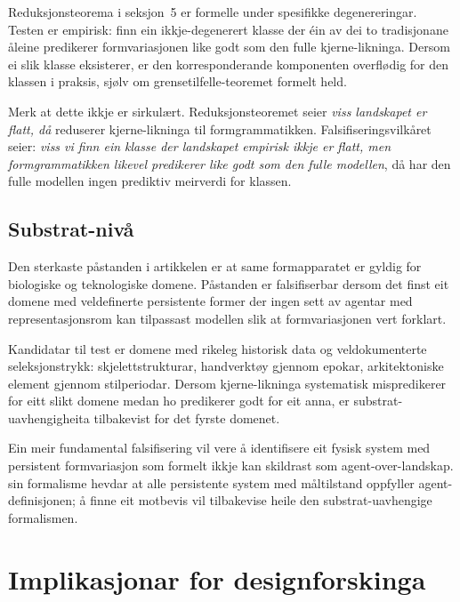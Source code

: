 \documentclass[10pt,a4paper,twocolumn]{article}
\begin{document}
Reduksjonsteorema i seksjon~5 er formelle under spesifikke degenereringar. Testen er empirisk: finn ein ikkje-degenerert klasse der éin av dei to tradisjonane åleine predikerer formvariasjonen like godt som den fulle kjerne-likninga. Dersom ei slik klasse eksisterer, er den korresponderande komponenten overflødig for den klassen i praksis, sjølv om grensetilfelle-teoremet formelt held.

Merk at dette ikkje er sirkulært. Reduksjonsteoremet seier \textit{viss landskapet er flatt, då} reduserer kjerne-likninga til formgrammatikken. Falsifiseringsvilkåret seier: \textit{viss vi finn ein klasse der landskapet empirisk ikkje er flatt, men formgrammatikken likevel predikerer like godt som den fulle modellen}, då har den fulle modellen ingen prediktiv meirverdi for klassen.

\subsection{Substrat-nivå}

Den sterkaste påstanden i artikkelen er at same formapparatet er gyldig for biologiske og teknologiske domene. Påstanden er falsifiserbar dersom det finst eit domene med veldefinerte persistente former der ingen sett av agentar med representasjonsrom kan tilpassast modellen slik at formvariasjonen vert forklart.

Kandidatar til test er domene med rikeleg historisk data og veldokumenterte seleksjonstrykk: skjelettstrukturar, handverktøy gjennom epokar, arkitektoniske element gjennom stilperiodar. Dersom kjerne-likninga systematisk mispredikerer for eitt slikt domene medan ho predikerer godt for eit anna, er substrat-uavhengigheita tilbakevist for det fyrste domenet.

Ein meir fundamental falsifisering vil vere å identifisere eit fysisk system med persistent formvariasjon som formelt ikkje kan skildrast som agent-over-landskap. \citet{fieldslevin2022} sin formalisme hevdar at alle persistente system med måltilstand oppfyller agent-definisjonen; å finne eit motbevis vil tilbakevise heile den substrat-uavhengige formalismen.

\section{Implikasjonar for designforskinga}
\end{document}
